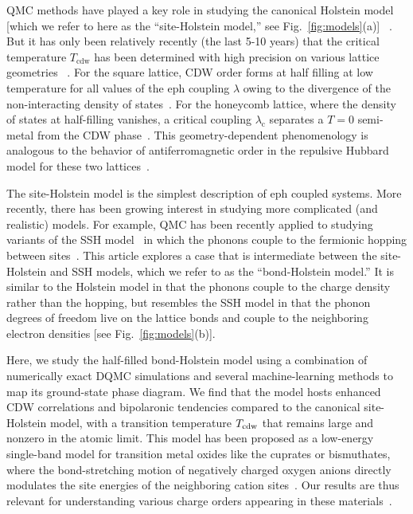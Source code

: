 \documentclass[%
reprint,
superscriptaddress,
nofootinbib,
twocolumn,
amsmath,amssymb,
aps,
prb,
]{revtex4-2}
\begin{document}
\Gls*{QMC} methods have played a key role in studying the canonical Holstein model [which we refer to here as the ``site-Holstein model,'' see Fig.~\ref{fig:models}(a)]
~\cite{peierls79, hirsch82, hirsch83, scalettar89, marsiglio90,freericks93}. But it has only been relatively recently (the last 5-10 years) that the critical temperature $T_\mathrm{cdw}$ has been determined with high precision on various lattice geometries
~\cite{ohgoe17, weber2018, zhang2019, hohenadler19, feng2020, bradley21, nosarzewski21, araujo22}. For the square lattice, \gls*{CDW} order forms at half filling at low temperature for all values of the \gls*{eph} coupling $\lambda$ owing to the divergence of the non-interacting density of states~\cite{hirsch82, scalettar89, marsiglio90}. For the honeycomb lattice, where the density of states at half-filling vanishes, a critical coupling $\lambda_\mathrm{c}$ separates a $T=0$ semi-metal from the \gls*{CDW} phase~\cite{Bradley2023}. This geometry-dependent phenomenology is analogous to the behavior of antiferromagnetic order in the repulsive Hubbard model for these two lattices~\cite{white89, sorella1992semi, paiva2005ground}.

The site-Holstein model is the simplest description of \gls*{eph} coupled systems. More recently, there has been growing interest in studying more complicated (and realistic) models. For example, \gls*{QMC} has been recently applied to studying variants of the \gls*{SSH} model~\cite{Barisic1970tightbinding, su1980soliton} in which the phonons couple to the fermionic hopping between sites~\cite{li2020quantum, xing2021quantum, malkaruge2023comparative, TanjaroonLy2023, cai2021antiferromagnetism}. This article explores a case that is intermediate between the site-Holstein and \gls*{SSH} models, which we refer to as the ``bond-Holstein model.'' It is similar to the Holstein model in that the phonons couple to the charge density rather than the hopping, but resembles the \gls*{SSH} model in that the phonon degrees of freedom live on the lattice bonds and couple to the neighboring electron densities [see Fig.~\ref{fig:models}(b)]. 

Here, we study the half-filled bond-Holstein model using a combination of numerically exact \gls*{DQMC} simulations and several machine-learning methods to map its ground-state phase diagram. We find that the model hosts enhanced \gls*{CDW} correlations and bipolaronic tendencies compared to the canonical site-Holstein model, with a transition temperature $T_{\rm cdw}$ that remains large and nonzero in the atomic limit. This model has been proposed as a low-energy single-band model for transition metal oxides like the cuprates or bismuthates, where the bond-stretching motion of negatively charged oxygen anions directly modulates the site energies of the neighboring cation sites~\cite{Song1995electron, Song1995erratum}. Our results are thus relevant for understanding various charge orders appearing in these materials~\cite{Sleight2015bismuthates, Arpaia2021charge}.
\end{document}

